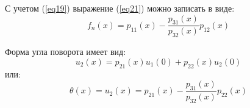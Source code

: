 С учетом (\ref{eq19}) выражение (\ref{eq21}) можно записать в виде:
\begin{equation}
    \label{eq22}
    f_n(x) = p_{11}(x) - \frac{p_{31}(x)}{p_{32}(x)} p_{12}(x)
\end{equation}

Форма угла поворота имеет вид:
\begin{equation}
    \label{eq23}
    u_2(x) = p_{21}(x) u_1(0) + p_{22}(x) u_2(0)
\end{equation}
или:
\begin{equation}
    \label{eq24}
    \theta(x) = u_2(x) = p_{21}(x) - \frac{p_{31}(x)}{p_{32}(x)} p_{22}(x)
\end{equation}